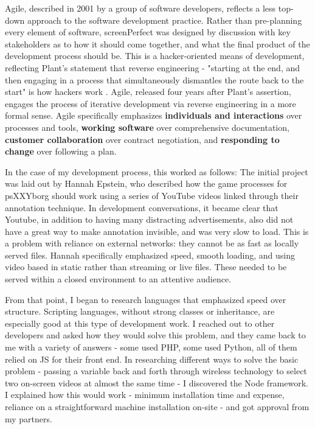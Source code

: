 Agile, described in 2001 by a group of software developers, reflects a less top-down approach to the software development practice. Rather than pre-planning every element of software, screenPerfect was designed by discussion with key stakeholders as to how it should come together, and what the final product of the development process should be. This is a hacker-oriented means of development, reflecting Plant's statement that reverse engineering - "starting at the end, and then engaging in a process that simultaneously dismantles the route back to the start" is how hackers work \cite{plant}. Agile, released four years after Plant's assertion, engages the process of iterative development via reverse engineering in a more formal sense. Agile specifically emphasizes \textbf{individuals and interactions} over processes and tools, \textbf{working software} over comprehensive documentation, \textbf{customer collaboration} over contract negotiation, and \textbf{responding to change} over following a plan. 

In the case of my development process, this worked as follows: The initial project was laid out by Hannah Epstein, who described how the game processes for psXXYborg should work using a series of YouTube videos linked through their annotation technique. In development conversations, it became clear that Youtube, in addition to having many distracting advertisements, also did not have a great way to make annotation invisible, and was very slow to load. This is a problem with reliance on external networks: they cannot be as fast as locally served files. Hannah specifically emphasized speed, smooth loading, and using video based in static rather than streaming or live files. These needed to be served within a closed environment to an attentive audience.

From that point, I began to research languages that emphasized speed over structure. Scripting languages, without strong classes or inheritance, are especially good at this type of development work. I reached out to other developers and asked how they would solve this problem, and they came back to me with a variety of answers - some used PHP, some used Python, all of them relied on JS for their front end. In researching different ways to solve the basic problem - passing a variable back and forth through wireless technology to select two on-screen videos at almost the same time - I discovered the Node framework. I explained how this would work - minimum installation time and expense, reliance on a straightforward machine installation on-site - and got approval from my partners.

